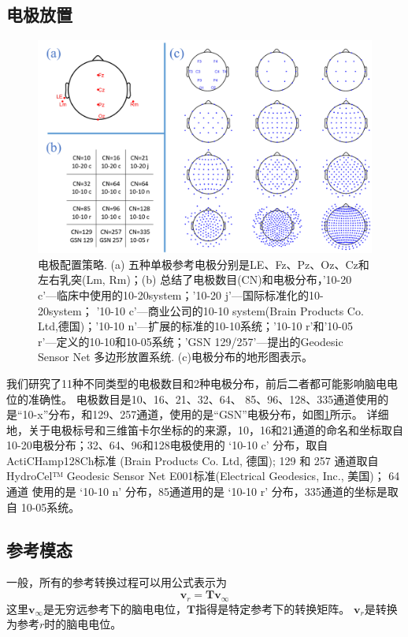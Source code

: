 \subsection{电极放置}
\begin{figure}[h!]
	\centering
	\includegraphics[width=15cm]{pic/JNE/figure2.png}
	\caption{电极配置策略. (a) 五种单极参考电极分别是LE、Fz、Pz、Oz、Cz和左右乳突(Lm, Rm)；(b) 总结了电极数目(CN)和电极分布，'10-20 c'—临床中使用的10-20system；'10-20 j'—国际标准化的10-20system； '10-10 c'—商业公司的10-10 system(Brain Products Co. Ltd,德国)；'10-10 n'—\cite{nuwer_m_r_ifcn_1998}扩展的标准的10-10系统；'10-10 r'和'10-05 r'—\cite{oostenveld_r_and_praamstra_p_five_2001}定义的10-10和10-05系统；'GSN 129/257'—\cite{tucker_d_m_spatial_1993}提出的Geodesic Sensor Net 多边形放置系统. (c)电极分布的地形图表示。}
	\label{2.2}
\end{figure}
我们研究了11种不同类型的电极数目和2种电极分布，前后二者都可能影响脑电电位的准确性。 电极数目是10、16、21、32、64、 85、96、128、335通道使用的是“10-x”分布，和129、257通道，使用的是“GSN”电极分布，如图\ref{2.2}所示。 详细地，关于电极标号和三维笛卡尔坐标的的来源，10，16和21通道的命名和坐标取自10-20电极分布；32、64、96和128电极使用的 ‘10-10 c’
分布，取自ActiCHamp128Ch标准 (Brain Products Co. Ltd, 德国); 129 和 257 通道取自HydroCel™ Geodesic Sensor Net E001标准(Electrical Geodesics, Inc., 美国)； 64 通道 使用的是 ‘10-10 n’ 分布，85通道用的是 ‘10-10 r’ 分布，335通道的坐标是取自
10-05系统。
\subsection{参考模态}
一般，所有的参考转换过程可以用公式表示为
\begin{equation}\label{eq2.3}
\mathbf{v}_r=\mathbf{Tv}_{\infty}
\end{equation}
这里$\mathbf{v}_{\infty}$是无穷远参考下的脑电电位，$\mathbf{T}$指得是特定参考下的转换矩阵。 $\mathbf{v}_r$是转换为参考$r$时的脑电电位。
